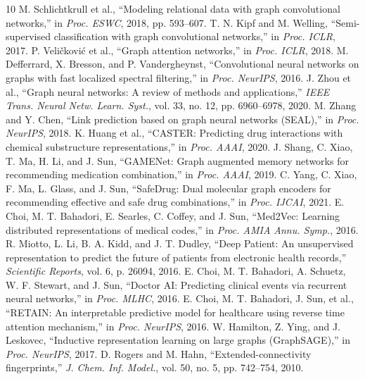 \documentclass[conference]{IEEEtran}
\begin{document}
\begin{thebibliography}{10}
 M. Schlichtkrull et al., ``Modeling relational data with graph convolutional networks,'' in \textit{Proc. ESWC}, 2018, pp. 593--607.
 T. N. Kipf and M. Welling, ``Semi-supervised classification with graph convolutional networks,'' in \textit{Proc. ICLR}, 2017.
 P. Veli{\v{c}}kovi{\'c} et al., ``Graph attention networks,'' in \textit{Proc. ICLR}, 2018.
 M. Defferrard, X. Bresson, and P. Vandergheynst, ``Convolutional neural networks on graphs with fast localized spectral filtering,'' in \textit{Proc. NeurIPS}, 2016.
 J. Zhou et al., ``Graph neural networks: A review of methods and applications,'' \textit{IEEE Trans. Neural Netw. Learn. Syst.}, vol. 33, no. 12, pp. 6960--6978, 2020.
 M. Zhang and Y. Chen, ``Link prediction based on graph neural networks (SEAL),'' in \textit{Proc. NeurIPS}, 2018.
 K. Huang et al., ``CASTER: Predicting drug interactions with chemical substructure representations,'' in \textit{Proc. AAAI}, 2020.
 J. Shang, C. Xiao, T. Ma, H. Li, and J. Sun, ``GAMENet: Graph augmented memory networks for recommending medication combination,'' in \textit{Proc. AAAI}, 2019.
 C. Yang, C. Xiao, F. Ma, L. Glass, and J. Sun, ``SafeDrug: Dual molecular graph encoders for recommending effective and safe drug combinations,'' in \textit{Proc. IJCAI}, 2021.
 E. Choi, M. T. Bahadori, E. Searles, C. Coffey, and J. Sun, ``Med2Vec: Learning distributed representations of medical codes,'' in \textit{Proc. AMIA Annu. Symp.}, 2016.
 R. Miotto, L. Li, B. A. Kidd, and J. T. Dudley, ``Deep Patient: An unsupervised representation to predict the future of patients from electronic health records,'' \textit{Scientific Reports}, vol. 6, p. 26094, 2016.
 E. Choi, M. T. Bahadori, A. Schuetz, W. F. Stewart, and J. Sun, ``Doctor AI: Predicting clinical events via recurrent neural networks,'' in \textit{Proc. MLHC}, 2016.
 E. Choi, M. T. Bahadori, J. Sun, et al., ``RETAIN: An interpretable predictive model for healthcare using reverse time attention mechanism,'' in \textit{Proc. NeurIPS}, 2016.
 W. Hamilton, Z. Ying, and J. Leskovec, ``Inductive representation learning on large graphs (GraphSAGE),'' in \textit{Proc. NeurIPS}, 2017.
 D. Rogers and M. Hahn, ``Extended-connectivity fingerprints,'' \textit{J. Chem. Inf. Model.}, vol. 50, no. 5, pp. 742--754, 2010.

\end{thebibliography}
\end{document}
